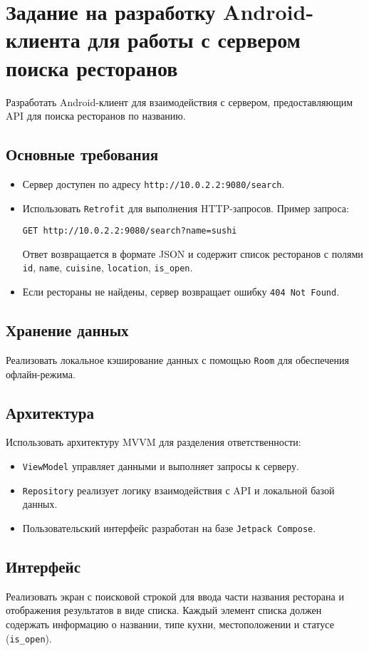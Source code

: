 \section{Задание на разработку Android-клиента для работы с сервером поиска ресторанов}

Разработать Android-клиент для взаимодействия с сервером, предоставляющим API для поиска ресторанов по названию.

\subsection{Основные требования}
\begin{itemize}
    \item Сервер доступен по адресу \texttt{http://10.0.2.2:9080/search}.
    \item Использовать \texttt{Retrofit} для выполнения HTTP-запросов. Пример запроса:
\begin{verbatim}
GET http://10.0.2.2:9080/search?name=sushi
\end{verbatim}
Ответ возвращается в формате JSON и содержит список ресторанов с полями \texttt{id}, \texttt{name}, \texttt{cuisine}, \texttt{location}, \texttt{is\_open}.
    \item Если рестораны не найдены, сервер возвращает ошибку \texttt{404 Not Found}.
\end{itemize}

\subsection{Хранение данных}
Реализовать локальное кэширование данных с помощью \texttt{Room} для обеспечения офлайн-режима.

\subsection{Архитектура}
Использовать архитектуру MVVM для разделения ответственности:
\begin{itemize}
    \item \texttt{ViewModel} управляет данными и выполняет запросы к серверу.
    \item \texttt{Repository} реализует логику взаимодействия с API и локальной базой данных.
    \item Пользовательский интерфейс разработан на базе \texttt{Jetpack Compose}.
\end{itemize}

\subsection{Интерфейс}
Реализовать экран с поисковой строкой для ввода части названия ресторана и отображения результатов в виде списка. Каждый элемент списка должен содержать информацию о названии, типе кухни, местоположении и статусе (\texttt{is\_open}).

